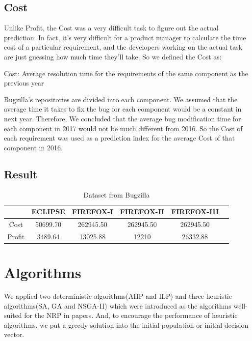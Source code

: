 \subsection{Cost}

 Unlike Profit, the Cost was a very difficult task to figure out the actual prediction. In fact, it's very difficult for a product manager to calculate the time cost of a particular requirement, and the developers working on the actual task are just guessing how much time they'll take. 
 So we defined the Cost as: 
 
Cost: Average resolution time for the requirements of the same component as the previous year

Bugzilla's repositories are divided into each component. We assumed that the average time it takes to fix the bug for each component would be a constant in next year. Therefore, We concluded that the average bug modification time for each component in 2017 would not be much different from 2016. So the Cost of each requirement was used as a prediction index for the average Cost of that component in 2016.


\subsection{Result}

\begin{table} [H]
  \caption{Dataset from Bugzilla}
  \label{tab:commands}
  \begin{tabular}{cccccl}
    \toprule
    &ECLIPSE&FIREFOX-I&FIREFOX-II&FIREFOX-III\\
    \midrule
    Cost& 50699.70& 262945.50& 262945.50& 262945.50 \\
    Profit& 3489.64& 13025.88& 12210& 26332.88 \\
    \bottomrule
  \end{tabular}
\label{table:Dataset}
\end{table}



\section{Algorithms}
We applied two deterministic algorithms(AHP and ILP) and three heuristic algorithms(SA, GA and NSGA-II) which were introduced as the algorithms well-suited for the NRP in papers\cite{NRP}\cite{ILP}\cite{IGA}\cite{MONRP}. And, to encourage the performance of heuristic algorithms, we put a greedy solution into the initial population or initial decision vector.

